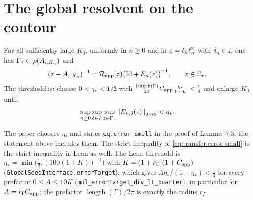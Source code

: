 \section{The global resolvent on the contour}

\begin{lemma}
  \label{lem:global-contour-resolvent}
  \leanok
  For all sufficiently large $K_0$, uniformly in $n\geq0$ and in
  $\varepsilon=\delta_n\ell_n^2$ with $\delta_n\in I$, one has
  $\Gamma_\tau\subset\rho(A_{\varepsilon,K_n})$ and
  \begin{equation}
    (z-A_{\varepsilon,K_n})^{-1}=\mathcal{R}_{\rm app}(z)\bigl(\mathrm{Id}+E_n(z)\bigr)^{-1},
    \qquad z\in\Gamma_\tau .
    \label{eq:transfer:global-resolvent}
  \end{equation}
  The threshold is: choose $0<\eta_*<1/2$ with
  $\tfrac{\operatorname{length}(\Gamma)}{2\pi}C_{\rm app}\tfrac{\eta_*}{1-\eta_*}<\tfrac14$
  and enlarge $K_0$ until
  \begin{equation}
    \sup_{n\geq0}\sup_{\delta\in I}\sup_{z\in\Gamma_\tau}\left\|E_{n,\delta}(z)\right\|_{2\to2}
      <\eta_* .
    \label{eq:transfer:error-small}
  \end{equation}
\end{lemma}

The paper chooses $\eta_*$ and states \texttt{eq:error-small} in the proof of Lemma~7.3; the
statement above includes them.  The strict inequality of \eqref{eq:transfer:error-small}
is the strict inequality in Lean as well.  The Lean threshold is
$\eta_*=\min\bigl(\tfrac12,(100(1+K))^{-1}\bigr)$ with $K=(1+r_\Gamma)(1+C_{\rm app})$
(\texttt{GlobalSeedInterface.errorTarget}), which gives $A\eta_*/(1-\eta_*)<\tfrac14$ for
every prefactor $0\leq A\leq10K$ (\texttt{mul\_errorTarget\_div\_lt\_quarter}), in
particular for $A=r_\Gamma C_{\rm app}$; the prefactor
$\operatorname{length}(\Gamma)/2\pi$ is exactly the radius $r_\Gamma$.

